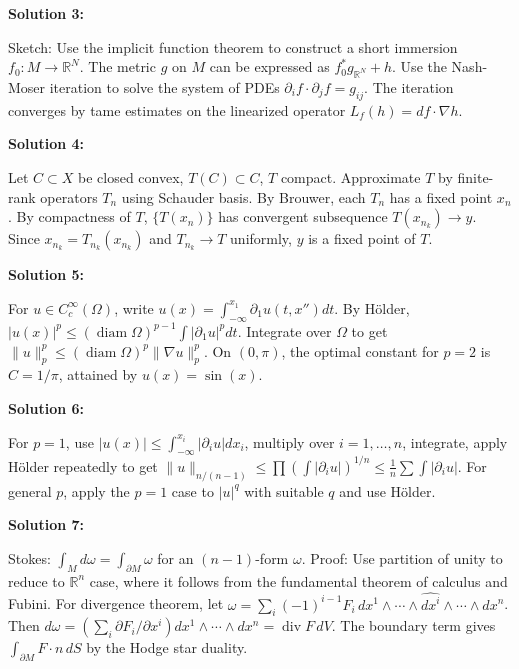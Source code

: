 \documentclass[12pt,a4paper]{exam}
\begin{document}
\vspace{0.5cm}

\textbf{Solution 3:}

Sketch: Use the implicit function theorem to construct a short immersion $f_0: M \to \mathbb{R}^N$. The metric $g$ on $M$ can be expressed as $f_0^*g_{\mathbb{R}^N} + h$. Use the Nash-Moser iteration to solve the system of PDEs $\partial_i f \cdot \partial_j f = g_{ij}$. The iteration converges by tame estimates on the linearized operator $L_f(h) = df \cdot \nabla h$.

\vspace{0.5cm}

\textbf{Solution 4:}

Let $C \subset X$ be closed convex, $T(C) \subset C$, $T$ compact. Approximate $T$ by finite-rank operators $T_n$ using Schauder basis. By Brouwer, each $T_n$ has a fixed point $x_n$. By compactness of $T$, $\{T(x_n)\}$ has convergent subsequence $T(x_{n_k}) \to y$. Since $x_{n_k} = T_{n_k}(x_{n_k})$ and $T_{n_k} \to T$ uniformly, $y$ is a fixed point of $T$.

\vspace{0.5cm}

\textbf{Solution 5:}

For $u \in C_c^\infty(\Omega)$, write $u(x) = \int_{-\infty}^{x_1} \partial_1 u(t, x'') dt$. By H\"older, $|u(x)|^p \leq (\operatorname{diam}\Omega)^{p-1} \int |\partial_1 u|^p dt$. Integrate over $\Omega$ to get $\|u\|_p^p \leq (\operatorname{diam}\Omega)^p \|\nabla u\|_p^p$. On $(0,\pi)$, the optimal constant for $p=2$ is $C = 1/\pi$, attained by $u(x) = \sin(x)$.

\vspace{0.5cm}

\textbf{Solution 6:}

For $p=1$, use $|u(x)| \leq \int_{-\infty}^{x_i} |\partial_i u| dx_i$, multiply over $i=1,\ldots,n$, integrate, apply H\"older repeatedly to get $\|u\|_{n/(n-1)} \leq \prod (\int |\partial_i u|)^{1/n} \leq \frac{1}{n} \sum \int |\partial_i u|$. For general $p$, apply the $p=1$ case to $|u|^q$ with suitable $q$ and use H\"older.

\vspace{0.5cm}

\textbf{Solution 7:}

Stokes: $\int_M d\omega = \int_{\partial M} \omega$ for an $(n-1)$-form $\omega$. Proof: Use partition of unity to reduce to $\mathbb{R}^n$ case, where it follows from the fundamental theorem of calculus and Fubini. For divergence theorem, let $\omega = \sum_i (-1)^{i-1} F_i \, dx^1 \wedge \cdots \wedge \widehat{dx^i} \wedge \cdots \wedge dx^n$. Then $d\omega = (\sum_i \partial F_i/\partial x^i) dx^1 \wedge \cdots \wedge dx^n = \operatorname{div} F \, dV$. The boundary term gives $\int_{\partial M} F \cdot n \, dS$ by the Hodge star duality.
\end{document}

